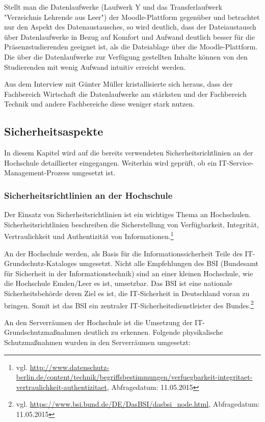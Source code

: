 Stellt man die Datenlaufwerke (Laufwerk Y und das Transferlaufwerk "Verzeichnis Lehrende aus Leer") der Moodle-Plattform gegenüber und betrachtet nur den Aspekt des Datenaustausches, so wird deutlich, dass der Dateiaustausch über Datenlaufwerke in Bezug auf Komfort und Aufwand deutlich besser für die Präsenzstudierenden geeignet ist, als die Dateiablage über die Moodle-Plattform. Die über die Datenlaufwerke zur Verfügung gestellten Inhalte können von den Studierenden mit wenig Aufwand intuitiv erreicht werden.

Aus dem Interview mit Günter Müller kristallisierte sich heraus, dass der Fachbereich Wirtschaft die Datenlaufwerke am stärksten und der Fachbereich Technik und andere Fachbereiche diese weniger stark nutzen.

\subsection{Sicherheitsaspekte}
In diesem Kapitel wird auf die bereits verwendeten Sicherheitsrichtlinien an der Hochschule detaillierter eingegangen. Weiterhin wird geprüft, ob ein IT-Service-Management-Prozess  umgesetzt ist.

\subsubsection{Sicherheitsrichtlinien an der Hochschule}
Der Einsatz von Sicherheitsrichtlinien ist ein wichtiges Thema an Hochschulen. Sicherheitsrichtlinien beschreiben die Sicherstellung von Verfügbarkeit, Integrität, Vertraulichkeit und Authentizität von Informationen.\footnote{vgl. \url{http://www.datenschutz-berlin.de/content/technik/begriffsbestimmungen/verfuegbarkeit-integritaet-vertraulichkeit-authentizitaet}, Abfragedatum: 11.05.2015}

An der Hochschule werden, als Basis für die Informationssicherheit Teile des IT-Grundschutz-Kataloges umgesetzt. Nicht alle Empfehlungen des BSI (Bundesamt für Sicherheit in der Informationstechnik) sind an einer kleinen Hochschule, wie die Hochschule Emden/Leer es ist,  umsetzbar. Das BSI ist eine nationale Sicherheitsbehörde deren Ziel es ist, die IT-Sicherheit in Deutschland voran zu bringen. Somit ist das BSI ein zentraler IT-Sicherheitsdienstleister des Bundes.\footnote{vgl. \url{https://www.bsi.bund.de/DE/DasBSI/dasbsi_node.html}, Abfragedatum: 11.05.2015}

An den Serverräumen der Hochschule ist die Umsetzung der IT-Grundschutzmaßnahmen deutlich zu erkennen.
Folgende physikalische Schutzmaßnahmen wurden in den Serverräumen umgesetzt:

